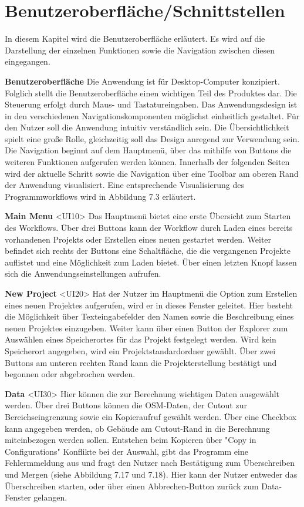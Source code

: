 \documentclass[parskip=full]{scrartcl} %
\begin{document}
\newpage



\section{Benutzeroberfläche/Schnittstellen}
In diesem Kapitel wird die Benutzeroberfläche erläutert. Es wird auf die Darstellung der einzelnen Funktionen sowie die Navigation zwischen diesen eingegangen.

\textbf{Benutzeroberfläche}
Die Anwendung ist für Desktop-Computer konzipiert. Folglich stellt die Benutzeroberfläche einen wichtigen Teil des Produktes dar.
Die Steuerung erfolgt durch Maus- und Tastatureingaben. Das Anwendungsdesign ist in den verschiedenen Navigationskomponenten möglichst einheitlich gestaltet. Für den Nutzer soll die Anwendung intuitiv verständlich sein. Die Übersichtlichkeit spielt eine große Rolle, gleichzeitig soll das Design anregend zur Verwendung sein.
Die Navigation beginnt auf dem Hauptmenü, über das mithilfe von Buttons die weiteren Funktionen aufgerufen werden können.
Innerhalb der folgenden Seiten wird der aktuelle Schritt sowie die Navigation über eine Toolbar am oberen Rand der Anwendung visualisiert. 
Eine entsprechende Visualisierung des Programmworkflows wird in Abbildung 7.3 erläutert.

\textbf{Main Menu }<UI10>
Das Hauptmenü bietet eine erste Übersicht zum Starten des Workflows. Über drei Buttons kann der Workflow durch Laden eines bereits vorhandenen Projekts oder Erstellen eines neuen gestartet werden. Weiter befindet sich rechts der Buttons eine Schaltfläche, die die vergangenen Projekte auflistet und eine Möglichkeit zum Laden bietet. Über einen letzten Knopf lassen sich die Anwendungseinstellungen aufrufen.

\textbf{New Project }<UI20>
Hat der Nutzer im Hauptmenü die Option zum Erstellen eines neuen Projektes aufgerufen, wird er in dieses Fenster geleitet.
Hier besteht die Möglichkeit über Texteingabefelder den Namen sowie die Beschreibung eines neuen Projektes einzugeben. Weiter kann über einen Button der Explorer zum Auswählen eines Speicherortes für das Projekt festgelegt werden. Wird kein Speicherort angegeben, wird ein Projektstandardordner gewählt.
Über zwei Buttons am unteren rechten Rand kann die Projekterstellung bestätigt und begonnen oder abgebrochen werden.

\textbf{Data }<UI30>
Hier können die zur Berechnung wichtigen Daten ausgewählt werden.
Über drei Buttons können die OSM-Daten, der Cutout zur Bereichseingrenzung sowie ein Kopieraufruf gewählt werden. Über eine Checkbox kann angegeben werden, ob Gebäude am Cutout-Rand in die Berechnung miteinbezogen werden sollen.
Entstehen beim Kopieren über "Copy in Configurations" Konflikte bei der Auswahl, gibt das Programm eine Fehlermmeldung aus und fragt den Nutzer nach Bestätigung zum Überschreiben und Mergen (siehe Abbildung 7.17 und 7.18). Hier kann der Nutzer entweder das Überschreiben starten, oder über einen Abbrechen-Button zurück zum Data-Fenster gelangen.
\end{document}
